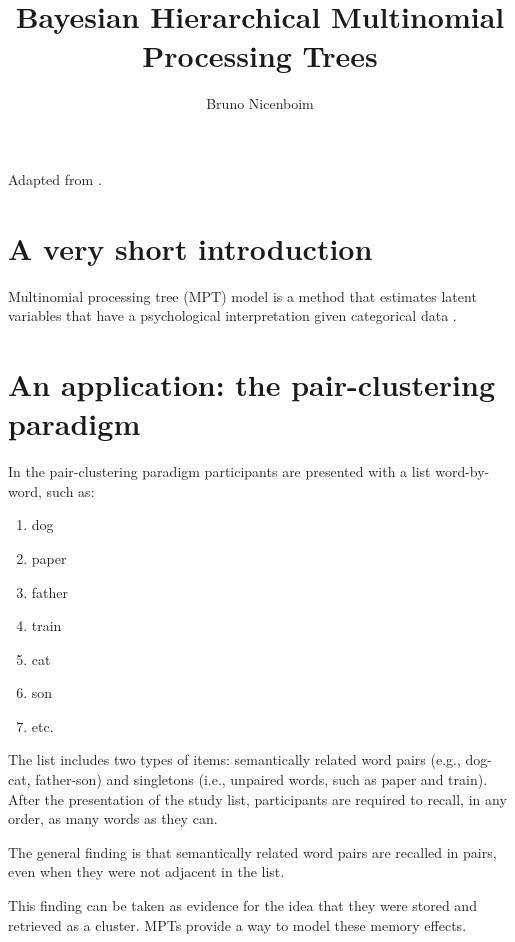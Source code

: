 \documentclass[10pt,a4paper]{article}
\author{Bruno Nicenboim}
\title{Bayesian Hierarchical Multinomial Processing Trees}
\begin{document}
\maketitle

Adapted from \textcites{MatzkeEtAl2013}[and][]{WagenmakersLee2013ch14}.

\section{A very short introduction}
Multinomial processing tree (MPT) model is a method that estimates latent variables that have a psychological interpretation given categorical data \parencite[see a review in ][]{BatchelderRiefer1999}.

\section{An application: the pair-clustering paradigm}

 In the pair-clustering paradigm \parencite{BatchelderRiefer1980} participants are presented with a list  word-by-word, such as: 
\begin{enumerate}
\item dog
\item paper
\item father
\item train
\item cat
\item son
\item etc. 

\end{enumerate}
The  list includes two types of items: semantically related word pairs (e.g., dog-cat, father-son) and singletons (i.e., unpaired words, such as paper and train). After the presentation of the study list, participants are required to recall, in any order, as many words as they can. 

The general finding is that semantically related word pairs are recalled in pairs, even when they were not adjacent in the list.

This finding can be taken as evidence for the idea that they were stored and retrieved as a cluster. MPTs \parencite{BatchelderRiefer1980} provide a way to model these memory effects.
\end{document}
